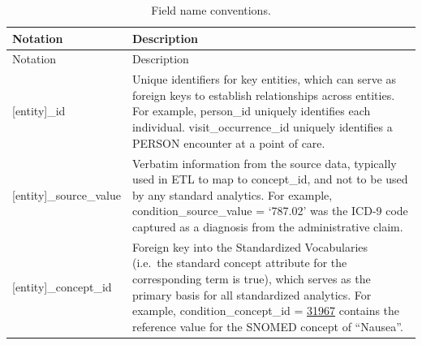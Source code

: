\documentclass[11pt]{book}
\theoremstyle{definition}
\theoremstyle{definition}
\theoremstyle{definition}
\theoremstyle{remark}
\begin{document}
\begin{longtable}[]{@{}ll@{}}
\caption{\label{tab:fieldConventions} Field name conventions.}\tabularnewline
\toprule
\begin{minipage}[b]{0.34\columnwidth}\raggedright
Notation\strut
\end{minipage} & \begin{minipage}[b]{0.61\columnwidth}\raggedright
Description\strut
\end{minipage}\tabularnewline
\midrule
\endfirsthead
\toprule
\begin{minipage}[b]{0.34\columnwidth}\raggedright
Notation\strut
\end{minipage} & \begin{minipage}[b]{0.61\columnwidth}\raggedright
Description\strut
\end{minipage}\tabularnewline
\midrule
\endhead
\begin{minipage}[t]{0.34\columnwidth}\raggedright
{[}entity{]}\_id\strut
\end{minipage} & \begin{minipage}[t]{0.61\columnwidth}\raggedright
Unique identifiers for key entities, which can serve as foreign keys to establish relationships across entities. For example, person\_id uniquely identifies each individual. visit\_occurrence\_id uniquely identifies a PERSON encounter at a point of care.\strut
\end{minipage}\tabularnewline
\begin{minipage}[t]{0.34\columnwidth}\raggedright
{[}entity{]}\_source\_value\strut
\end{minipage} & \begin{minipage}[t]{0.61\columnwidth}\raggedright
Verbatim information from the source data, typically used in ETL to map to concept\_id, and not to be used by any standard analytics. For example, condition\_source\_value = `787.02' was the ICD-9 code captured as a diagnosis from the administrative claim.\strut
\end{minipage}\tabularnewline
\begin{minipage}[t]{0.34\columnwidth}\raggedright
{[}entity{]}\_concept\_id\strut
\end{minipage} & \begin{minipage}[t]{0.61\columnwidth}\raggedright
Foreign key into the Standardized Vocabularies (i.e.~the standard concept attribute for the corresponding term is true), which serves as the primary basis for all standardized analytics. For example, condition\_concept\_id = \href{http://athena.ohdsi.org/search-terms/terms/31967}{31967} contains the reference value for the SNOMED concept of ``Nausea''.\strut

\end{minipage}
\end{longtable}
\end{document}
